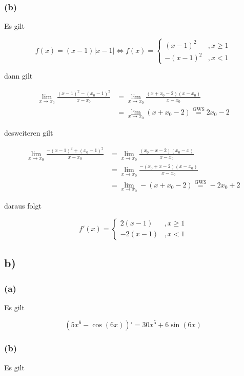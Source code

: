\documentclass[a4paper, 11pt]{article}
\begin{document}
\subsubsection{(b)}
\label{sec:org0c5d25a}
Es gilt

$$ f(x) = (x-1)|x-1| \Leftrightarrow f(x) =
    \begin{cases}
        (x-1)^2 &, x \geq 1 \\
        -(x-1)^2 &, x < 1
    \end{cases} $$

dann gilt

\begin{align*}
    \lim_{x \rightarrow x_0} \frac{(x - 1)^2 - (x_0 - 1)^2}{x - x_0} &=
        \lim_{x \rightarrow x_0} \frac{(x + x_0 - 2)(x - x_0)}{x - x_0} \\
    &= \lim_{x \rightarrow x_0} (x + x_0 - 2)
        \overset{\text{GWS}}{=} 2x_0 - 2
\end{align*}

desweiteren gilt

\begin{align*}
    \lim_{x \rightarrow x_0} \frac{-(x - 1)^2 + (x_0 - 1)^2}{x - x_0} &=
        \lim_{x \rightarrow x_0} \frac{(x_0 + x - 2)(x_0 - x)}{x - x_0} \\
    &= \lim_{x \rightarrow x_0} \frac{-(x_0 + x - 2)(x - x_0)}{x - x_0} \\
    &= \lim_{x \rightarrow x_0} -(x + x_0 - 2)
        \overset{\text{GWS}}{=} -2x_0 + 2
\end{align*}

daraus folgt

$$ f'(x) =
    \begin{cases}
        2(x-1) &, x \geq 1 \\
        -2(x-1) &, x < 1
    \end{cases} $$

\subsection{b)}
\label{sec:org5dd23f9}
\subsubsection{(a)}
\label{sec:orgb250665}
Es gilt

$$ (5x^6 - \cos(6x))' = 30x^5 + 6\sin(6x) $$

\subsubsection{(b)}
\label{sec:org548a63a}
Es gilt
\end{document}
